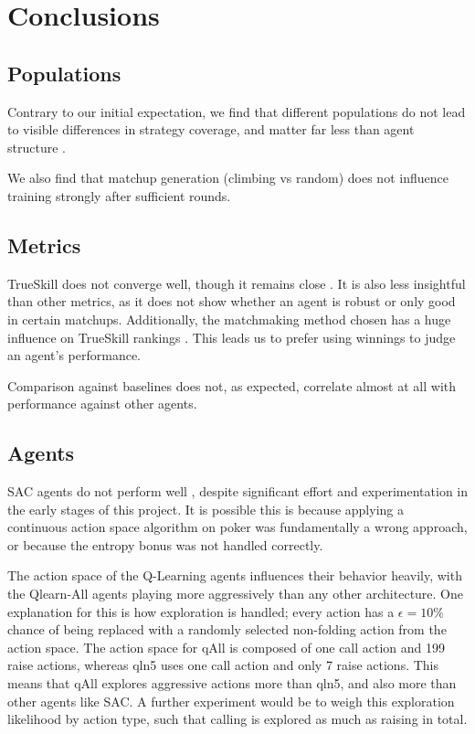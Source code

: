 \chapter{Conclusions}

\section{Populations}
Contrary to our initial expectation, we find that different populations do not lead to visible differences in strategy coverage, and matter far less than agent structure .

We also find that matchup generation (climbing vs random) does not influence training strongly after sufficient rounds.

\section{Metrics}
TrueSkill does not converge well, though it remains close . It is also less insightful than other metrics, as it does not show whether an agent is robust or only good in certain matchups. 
Additionally, the matchmaking method chosen has a huge influence on TrueSkill rankings . This leads us to prefer using winnings to judge an agent's performance.

Comparison against baselines does not, as expected, correlate almost at all with performance against other agents. 

\section{Agents}
SAC agents do not perform well , despite significant effort and experimentation in the early stages of this project. It is possible this is because applying a continuous action space algorithm on poker was fundamentally a wrong approach, or because the entropy bonus was not handled correctly.

The action space of the Q-Learning agents influences their behavior heavily, with the Qlearn-All agents playing more aggressively than any other architecture.
One explanation for this is how exploration is handled; every action has a $\epsilon = 10\%$ chance of being replaced with a randomly selected non-folding action from the action space. The action space for qAll is composed of one call action and 199 raise actions, whereas qln5 uses one call action and only 7 raise actions. This means that qAll explores aggressive actions more than qln5, and also more than other agents like SAC. A further experiment would be to weigh this exploration likelihood by action type, such that calling is explored as much as raising in total.  